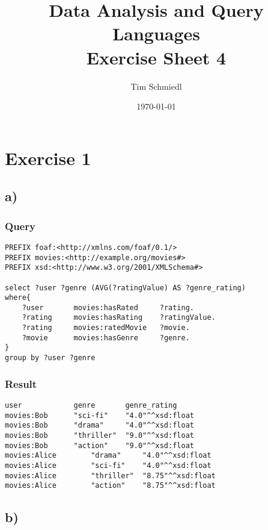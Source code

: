 \documentclass{article}
\begin{document}
\title{Data Analysis and Query Languages \\
 Exercise Sheet 4}
\date{\today}
\author{Tim Schmiedl} 
\maketitle

\section*{Exercise 1}
\subsection*{a)}
\subsubsection*{Query}
\begin{lstlisting}
PREFIX foaf:<http://xmlns.com/foaf/0.1/>
PREFIX movies:<http://example.org/movies#>
PREFIX xsd:<http://www.w3.org/2001/XMLSchema#>

select ?user ?genre (AVG(?ratingValue) AS ?genre_rating)
where{
	?user 		movies:hasRated 	?rating.
	?rating 	movies:hasRating	?ratingValue.
	?rating 	movies:ratedMovie	?movie.
	?movie		movies:hasGenre		?genre.
}
group by ?user ?genre
\end{lstlisting}
\subsubsection*{Result}
\begin{lstlisting}
user			genre		genre_rating
movies:Bob 		"sci-fi" 	"4.0"^^xsd:float
movies:Bob 		"drama" 	"4.0"^^xsd:float
movies:Bob 		"thriller" 	"9.0"^^xsd:float
movies:Bob 		"action" 	"9.0"^^xsd:float
movies:Alice 		"drama" 	"4.0"^^xsd:float
movies:Alice 		"sci-fi" 	"4.0"^^xsd:float
movies:Alice 		"thriller" 	"8.75"^^xsd:float
movies:Alice 		"action" 	"8.75"^^xsd:float
\end{lstlisting}

\vspace{1cm}
\newpage
\subsection*{b)}
\end{document}
